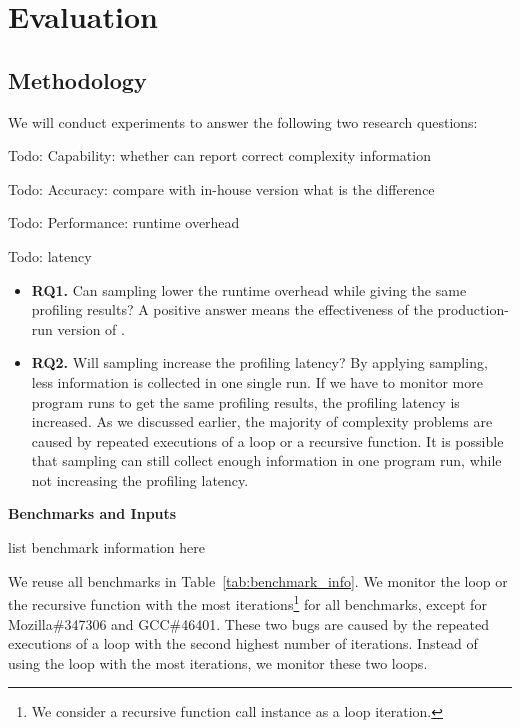 \section{Evaluation}
\label{sec:eva}


\subsection{Methodology}
We will conduct experiments to answer the following two research questions:

{\color{red} Todo: Capability: whether \Tool can report correct complexity information}

{\color{red} Todo: Accuracy: compare with in-house version what is the difference}

{\color{red} Todo: Performance: runtime overhead}

{\color{red} Todo: latency}

\begin{itemize}



\item {\bf RQ1.} 
Can sampling lower the runtime overhead while giving the same profiling results? 
A positive answer means the effectiveness of the production-run version of \Tool. 

\item {\bf RQ2.} 
Will sampling increase the profiling latency? 
By applying sampling, less information is collected in one single run. 
If we have to monitor more program runs to get the same profiling results,
the profiling latency is increased.
As we discussed earlier, the majority of complexity problems are caused 
by repeated executions of a loop or a recursive function.
It is possible that sampling can still collect enough information in one program run, 
while not increasing the profiling latency. 


\end{itemize}

\noindent\textbf{Benchmarks and Inputs}

{\color{red} list benchmark information here}

We reuse all benchmarks in Table~\ref{tab:benchmark_info}.
We monitor the loop or the recursive function with the most iterations\footnote{We consider a recursive function call instance as a loop iteration.} 
for all benchmarks,
except for Mozilla\#347306 and GCC\#46401. 
These two bugs are caused by the repeated executions of a loop with the second
highest number of iterations. Instead of using the loop with the most iterations,
we monitor these two loops.


